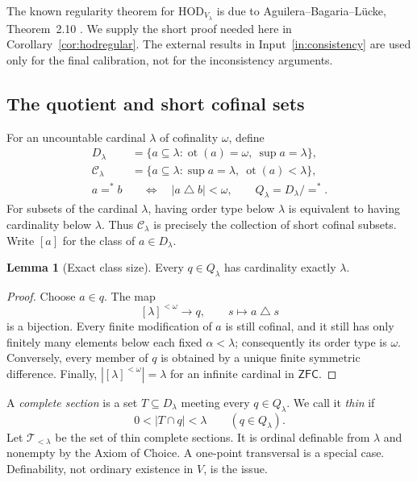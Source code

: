 \documentclass[11pt,letterpaper]{article}
\theoremstyle{definition}
\newtheorem{lemma}[definition]{Lemma}
\numberwithin{equation}{section}
\newcommand{\ZFC}{\mathsf{ZFC}}
\newcommand{\HOD}{\mathrm{HOD}}
\newcommand{\ot}{\operatorname{ot}}
\newcommand{\D}{D_\lambda}
\newcommand{\Q}{Q_\lambda}
\newcommand{\C}{\mathcal C_\lambda}
\newcommand{\NN}{\HOD_{V_\lambda}}
\newcommand{\Sym}{\mathbin{\triangle}}
\newcommand{\Thin}{\mathcal T_{<\lambda}}
\begin{document}
The known regularity theorem for $\NN$ is due to Aguilera--Bagaria--L\"ucke, Theorem~2.10 \cite{abl}. We supply the short proof needed here in Corollary~\ref{cor:hodregular}. The external results in Input~\ref{in:consistency} are used only for the final calibration, not for the inconsistency arguments.

\subsection{The quotient and short cofinal sets}

For an uncountable cardinal $\lambda$ of cofinality $\omega$, define
\begin{align}
 \D&=\{a\subseteq\lambda:\ot(a)=\omega,\ \sup a=\lambda\},\label{eq:D}\\
 \C&=\{a\subseteq\lambda:\sup a=\lambda,\ \ot(a)<\lambda\},\label{eq:C}\\
 a=^*b&\quad\Longleftrightarrow\quad |a\Sym b|<\omega,
 \qquad \Q=\D/{=^*}.\label{eq:Q}
\end{align}
For subsets of the cardinal $\lambda$, having order type below $\lambda$ is equivalent to having cardinality below $\lambda$. Thus $\C$ is precisely the collection of short cofinal subsets. Write $[a]$ for the class of $a\in\D$.

\begin{lemma}[Exact class size]\label{lem:classsize}
Every $q\in\Q$ has cardinality exactly $\lambda$.
\end{lemma}
\begin{proof}
Choose $a\in q$. The map
\[
 [\lambda]^{<\omega}\longrightarrow q,\qquad s\longmapsto a\Sym s
\]
is a bijection. Every finite modification of $a$ is still cofinal, and it still has only finitely many elements below each fixed $\alpha<\lambda$; consequently its order type is $\omega$. Conversely, every member of $q$ is obtained by a unique finite symmetric difference. Finally, $|[\lambda]^{<\omega}|=\lambda$ for an infinite cardinal in $\ZFC$.
\end{proof}

A \emph{complete section} is a set $T\subseteq\D$ meeting every $q\in\Q$. We call it \emph{thin} if
\begin{equation}\label{eq:thin}
 0<|T\cap q|<\lambda\qquad(q\in\Q).
\end{equation}
Let $\Thin$ be the set of thin complete sections. It is ordinal definable from $\lambda$ and nonempty by the Axiom of Choice. A one-point transversal is a special case. Definability, not ordinary existence in $V$, is the issue.
\end{document}
